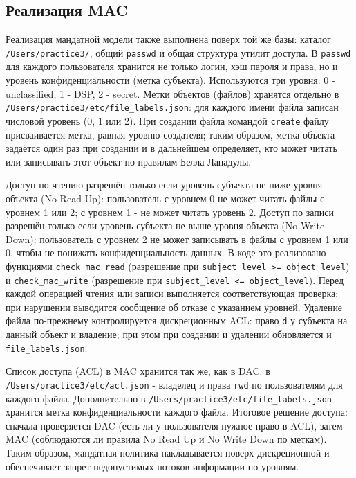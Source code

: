 \documentclass[areasetadvanced]{scrartcl}
\begin{document}
\subsection{Реализация MAC}

Реализация мандатной модели также выполнена поверх той же базы: каталог \texttt{/Users/practice3/}, общий \texttt{passwd} и общая структура утилит доступа. В \texttt{passwd} для каждого пользователя хранится не только логин, хэш пароля и права, но и уровень конфиденциальности (метка субъекта). Используются три уровня: 0 - unclassified, 1 - DSP, 2 - secret. Метки объектов (файлов) хранятся отдельно в \texttt{/Users/practice3/etc/file\_labels.json}: для каждого имени файла записан числовой уровень (0, 1 или 2). При создании файла командой \texttt{create} файлу присваивается метка, равная уровню создателя; таким образом, метка объекта задаётся один раз при создании и в дальнейшем определяет, кто может читать или записывать этот объект по правилам Белла-Лападулы.

Доступ по чтению разрешён только если уровень субъекта не ниже уровня объекта (No Read Up): пользователь с уровнем 0 не может читать файлы с уровнем 1 или 2; с уровнем 1 - не может читать уровень 2. Доступ по записи разрешён только если уровень субъекта не выше уровня объекта (No Write Down): пользователь с уровнем 2 не может записывать в файлы с уровнем 1 или 0, чтобы не понижать конфиденциальность данных. В коде это реализовано функциями \texttt{check\_mac\_read} (разрешение при \texttt{subject\_level >= object\_level}) и \texttt{check\_mac\_write} (разрешение при \texttt{subject\_level <= object\_level}). Перед каждой операцией чтения или записи выполняется соответствующая проверка; при нарушении выводится сообщение об отказе с указанием уровней. Удаление файла по-прежнему контролируется дискреционным ACL: право \texttt{d} у субъекта на данный объект и владение; при этом при создании и удалении обновляется и \texttt{file\_labels.json}.

Список доступа (ACL) в MAC хранится так же, как в DAC: в \texttt{/Users/practice3/etc/acl.json} - владелец и права \texttt{rwd} по пользователям для каждого файла. Дополнительно в \texttt{/Users/practice3/etc/file\_labels.json} хранится метка конфиденциальности каждого файла. Итоговое решение доступа: сначала проверяется DAC (есть ли у пользователя нужное право в ACL), затем MAC (соблюдаются ли правила No Read Up и No Write Down по меткам). Таким образом, мандатная политика накладывается поверх дискреционной и обеспечивает запрет недопустимых потоков информации по уровням.
\end{document}
